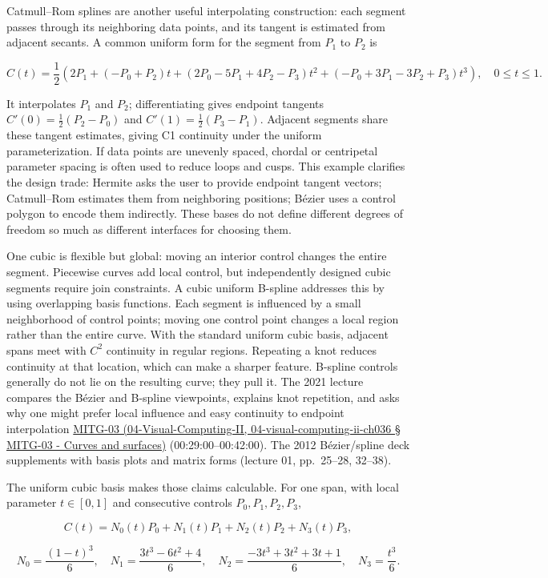 Catmull--Rom splines are another useful interpolating construction: each segment passes through its neighboring data points, and its tangent is estimated from adjacent secants. A common uniform form for the segment from \(P_1\) to \(P_2\) is

\[
C(t)=\frac12\left(2P_1+(-P_0+P_2)t+(2P_0-5P_1+4P_2-P_3)t^2+(-P_0+3P_1-3P_2+P_3)t^3\right),\quad 0\le t\le1.
\]

It interpolates \(P_1\) and \(P_2\); differentiating gives endpoint tangents \(C'(0)=\frac12(P_2-P_0)\) and \(C'(1)=\frac12(P_3-P_1)\). Adjacent segments share these tangent estimates, giving C1 continuity under the uniform parameterization. If data points are unevenly spaced, chordal or centripetal parameter spacing is often used to reduce loops and cusps. This example clarifies the design trade: Hermite asks the user to provide endpoint tangent vectors; Catmull--Rom estimates them from neighboring positions; Bézier uses a control polygon to encode them indirectly. These bases do not define different degrees of freedom so much as different interfaces for choosing them.

One cubic is flexible but global: moving an interior control changes the entire segment. Piecewise curves add local control, but independently designed cubic segments require join constraints. A cubic uniform B-spline addresses this by using overlapping basis functions. Each segment is influenced by a small neighborhood of control points; moving one control point changes a local region rather than the entire curve. With the standard uniform cubic basis, adjacent spans meet with \(C^2\) continuity in regular regions. Repeating a knot reduces continuity at that location, which can make a sharper feature. B-spline controls generally do not lie on the resulting curve; they pull it. The 2021 lecture compares the Bézier and B-spline viewpoints, explains knot repetition, and asks why one might prefer local influence and easy continuity to endpoint interpolation \href{}{MITG-03 (04-Visual-Computing-II, 04-visual-computing-ii-ch036 § MITG-03 - Curves and surfaces)} (00:29:00--00:42:00). The 2012 Bézier/spline deck supplements with basis plots and matrix forms (lecture 01, pp.~25--28, 32--38).

The uniform cubic basis makes those claims calculable. For one span, with local parameter \(t\in[0,1]\) and consecutive controls \(P_0,P_1,P_2,P_3\),

\[
C(t)=N_0(t)P_0+N_1(t)P_1+N_2(t)P_2+N_3(t)P_3,
\]

\[
N_0=\frac{(1-t)^3}{6},\quad N_1=\frac{3t^3-6t^2+4}{6},\quad
N_2=\frac{-3t^3+3t^2+3t+1}{6},\quad N_3=\frac{t^3}{6}.
\]

